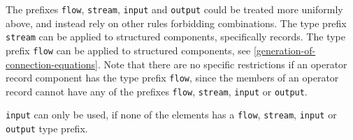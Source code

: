 \begin{nonnormative}
The prefixes \lstinline!flow!, \lstinline!stream!, \lstinline!input! and \lstinline!output! could be treated more uniformly above, and instead rely on other rules forbidding combinations.
The type prefix \lstinline!stream! can be applied to structured components, specifically records.
The type prefix \lstinline!flow! can be applied to structured components, see \cref{generation-of-connection-equations}.
Note that there are no specific restrictions if an operator record component has the type prefix \lstinline!flow!, since the members of an operator record cannot have any of the prefixes \lstinline!flow!, \lstinline!stream!, \lstinline!input! or \lstinline!output!.
\end{nonnormative}

\begin{example}
\lstinline!input! can only be used, if none of the elements has a \lstinline!flow!, \lstinline!stream!, \lstinline!input! or \lstinline!output! type prefix.
\end{example}

